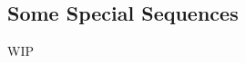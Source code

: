 \documentclass[../poma-notes.tex]{subfiles}
\begin{document}
\subsection*{Some Special Sequences}

WIP
\end{document}
